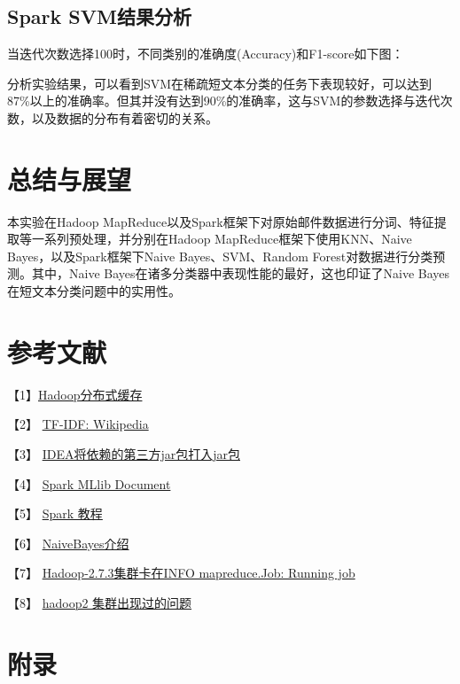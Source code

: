 \documentclass[lang=cn,11pt]{elegantpaper}
\begin{document}
\subsection{Spark SVM结果分析}
当迭代次数选择100时，不同类别的准确度(Accuracy)和F1-score如下图：\par


分析实验结果，可以看到SVM在稀疏短文本分类的任务下表现较好，可以达到87\%以上的准确率。但其并没有达到90\%的准确率，这与SVM的参数选择与迭代次数，以及数据的分布有着密切的关系。



\section{总结与展望}
本实验在Hadoop MapReduce以及Spark框架下对原始邮件数据进行分词、特征提取等一系列预处理，并分别在Hadoop MapReduce框架下使用KNN、Naive Bayes，以及Spark框架下Naive Bayes、SVM、Random Forest对数据进行分类预测。其中，Naive Bayes在诸多分类器中表现性能的最好，这也印证了Naive Bayes在短文本分类问题中的实用性。


\section{参考文献}
【1】\href{https://www.cnblogs.com/loveling-0239/p/7884195.html}{Hadoop分布式缓存}\par
【2】 \href{https://en.wikipedia.org/wiki/Tf%E2%80%93idf}{TF-IDF: Wikipedia} \par
【3】 \href{https://blog.csdn.net/qq_41571900/article/details/85069055}{IDEA将依赖的第三方jar包打入jar包} \par
【4】 \href{http://spark.apache.org/docs/latest/ml-features.html}{Spark MLlib Document}\par
【5】 \href{http://dblab.xmu.edu.cn/blog/spark/}{Spark 教程}\par
【6】 \href{https://nlp.stanford.edu/IR-book/html/htmledition/naive-bayes-text-classification-1.html}{NaiveBayes介绍}\par
【7】 \href{https://blog.csdn.net/SCGH_Fx/article/details/60783466}{Hadoop-2.7.3集群卡在INFO mapreduce.Job: Running job}\par
【8】 \href{https://blog.csdn.net/iteye_3893/article/details/82636364}{hadoop2 集群出现过的问题}
\appendix
 \section{附录}
\end{document}

